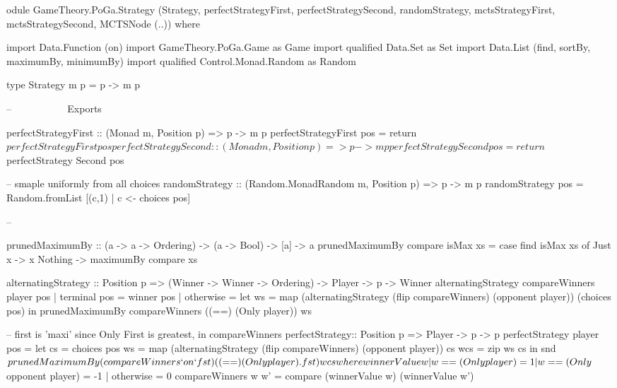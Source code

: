 \begin{code}


odule GameTheory.PoGa.Strategy
       (Strategy,
        perfectStrategyFirst,
        perfectStrategySecond,
        randomStrategy,
        mctsStrategyFirst,
        mctsStrategySecond,
        MCTSNode (..))
       where


import Data.Function (on)
import GameTheory.PoGa.Game as Game
import qualified Data.Set as Set
import Data.List (find, sortBy, maximumBy, minimumBy)
import qualified Control.Monad.Random as Random

type Strategy m p = p -> m p

-- ~~~~~~~~~~ Exports ~~~~~~~~~~~~~~~~~~~~~~~~~~~~~~~~~

perfectStrategyFirst :: (Monad m, Position p) => p -> m p
perfectStrategyFirst pos = return $ perfectStrategy First pos
perfectStrategySecond :: (Monad m, Position p) => p -> m p
perfectStrategySecond pos = return $ perfectStrategy Second pos

-- smaple uniformly from all choices
randomStrategy :: (Random.MonadRandom m, Position p) => p -> m p
randomStrategy pos = Random.fromList [(c,1) | c <- choices pos]


-- ~~~~~~~~~~~~~~~~~~~~~~~~~~~~~~~~~~~~~~~~~~~~~~~~~~~~

prunedMaximumBy :: (a -> a -> Ordering) -> (a -> Bool) -> [a] -> a
prunedMaximumBy compare isMax xs = 
  case find isMax xs of
    Just x -> x
    Nothing -> maximumBy compare xs


alternatingStrategy :: Position p =>
  (Winner -> Winner -> Ordering) -> Player -> p -> Winner
alternatingStrategy compareWinners player pos
  | terminal pos = winner pos
  | otherwise =
      let ws = map (alternatingStrategy (flip compareWinners) (opponent player))
                   (choices pos) in
      prunedMaximumBy compareWinners ((==) (Only player)) ws
    

-- first is 'maxi' since Only First is greatest, in compareWinners
perfectStrategy:: Position p => Player -> p -> p
perfectStrategy player pos = 
  let cs = choices pos
      ws = map (alternatingStrategy (flip compareWinners) (opponent player)) cs
      wcs = zip ws cs in
  snd $ prunedMaximumBy (compareWinners `on` fst) ((==) (Only player) . fst) wcs
  where
    winnerValue w
      | w == (Only player) = 1
      | w == (Only $ opponent player) = -1
      | otherwise = 0
    compareWinners w w' = compare (winnerValue w) (winnerValue w') 





\end{code}
